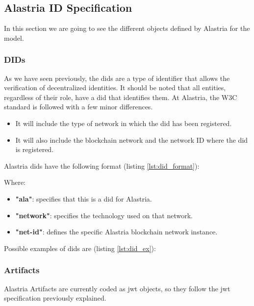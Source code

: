 \documentclass[a4paper, 12pt]{article} %
\begin{document}
    \subsection{Alastria ID Specification}
        In this section we are going to see the different objects defined by Alastria for the model.
        \subsubsection{DIDs}
            As we have seen previously, the \acrfull{dids} are a type of identifier that allows the verification of decentralized identities. It should be noted that all entities, regardless of their role, have a \acrshort{did} that identifies them. At Alastria, the W3C standard is followed with a few minor differences.
            \begin{itemize}
                \item It will include the type of network in which the \acrshort{did} has been registered.
                \item It will also include the blockchain network and the network ID where the \acrshort{did} is registered.
            \end{itemize}
            
            Alastria \acrshort{dids} have the following format (listing \ref{lst:did_format}):
            
            Where:
            \begin{itemize}
                \item \textbf{"ala"}: specifies that this is a \acrshort{did} for Alastria.
                \item \textbf{"network"}: specifies the technology used on that network. 
                \item \textbf{"net-id"}: defines the specific Alastria blockchain network instance.
            \end{itemize}
            Possible examples of \acrshort{dids} are (listing \ref{lst:did_ex}):
            

        \subsubsection{Artifacts}
            Alastria Artifacts are currently coded as \acrshort{jwt} objects, so they follow the \acrshort{jwt} specification previously explained.
            
\end{document}

